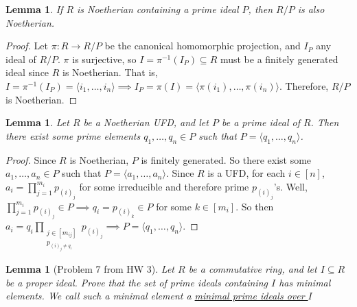 \documentclass[addpoints,10pt]{exam}
\theoremstyle{plain}
\theoremstyle{definition}
\theoremstyle{plain}
\theoremstyle{plain}
\newtheorem{lem}[thm]{Lemma}
\theoremstyle{definition}
\begin{document}
\begin{lem}
    If $R$ is Noetherian containing a prime ideal $P$, then $R/P$ is also Noetherian. 
\end{lem}
\begin{proof}
    Let $\pi:R\to R/P$ be the canonical homomorphic projection, and $I_{P}$ any ideal of $R/P$. $\pi$ is surjective, so $I=\pi^{-1}(I_{P})\subseteq R$ must be a finitely generated ideal since $R$ is Noetherian. That is, $I=\pi^{-1}(I_{P})=\langle i_{1},\hdots, i_{n}\rangle\implies I_{P}=\pi(I)=\langle \pi(i_{1}),\hdots, \pi(i_{n})\rangle$. Therefore, $R/P$ is Noetherian.

\end{proof}
\begin{lem}
    Let $R$ be a Noetherian UFD, and let $P$ be a prime ideal of $R$. Then there exist some prime elements $q_{1},\hdots, q_{n}\in P$ such that $P=\langle q_{1},\hdots, q_{n}\rangle$.
\end{lem}
\begin{proof}
    Since $R$ is Noetherian, $P$ is finitely generated. So there exist some $a_{1},\hdots, a_{n}\in P$ such that $P=\langle a_{1},\hdots, a_{n}\rangle$. Since $R$ is a UFD, for each $i\in [n]$, $a_{i}=\prod_{j=1}^{m_{i}}p_{(i)_{j}}$ for some irreducible and therefore prime $p_{(i)_{j}}$'s. Well, $\prod_{j=1}^{m_{i}}p_{(i)_{j}}\in P\implies q_{i}=p_{(i)_{k}}\in P$ for some $k\in [m_{i}]$. So then $a_{i}=q_{i}\prod_{\substack{j\in [m_{ij}]\\ p_{(i)_{j}\neq q_{i}}}} p_{(i)_{j}}\implies P=\langle q_{1},\hdots, q_{n}\rangle.$

\end{proof}

\begin{lem}[Problem 7 from HW 3]\label{lem:minprime}
Let $R$ be a commutative ring, and let $I \subseteq R$ be a proper ideal. Prove that the set of prime ideals containing $I$ has minimal elements. We call such a minimal element a \underline{minimal prime ideals over $I$}
\end{lem}
\end{document}

